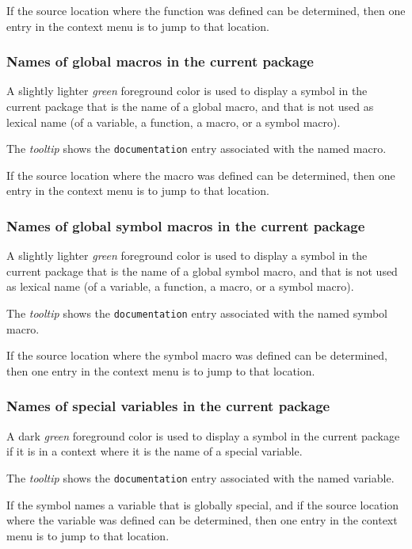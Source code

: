 If the source location where the function was defined can be
determined, then one entry in the context menu is to jump to that
location.

\subsubsection{Names of global macros in the current package}

A slightly lighter \emph{green} foreground color is used to display a
symbol in the current package that is the name of a global macro, and
that is not used as lexical name (of a variable, a function, a macro,
or a symbol macro).

The \emph{tooltip} shows the \texttt{documentation} entry associated
with the named macro.

If the source location where the macro was defined can be
determined, then one entry in the context menu is to jump to that
location.

\subsubsection{Names of global symbol macros in the current package}

A slightly lighter \emph{green} foreground color is used to display a
symbol in the current package that is the name of a global symbol
macro, and that is not used as lexical name (of a variable, a
function, a macro, or a symbol macro).

The \emph{tooltip} shows the \texttt{documentation} entry associated
with the named symbol macro.

If the source location where the symbol macro was defined can be
determined, then one entry in the context menu is to jump to that
location.

\subsubsection{Names of special variables in the current package}

A dark \emph{green} foreground color is used to display a symbol in
the current package if it is in a context where it is the name of a
special variable.

The \emph{tooltip} shows the \texttt{documentation} entry associated
with the named variable.

If the symbol names a variable that is globally special, and if
the source location where the variable was defined can be
determined, then one entry in the context menu is to jump to that
location.

